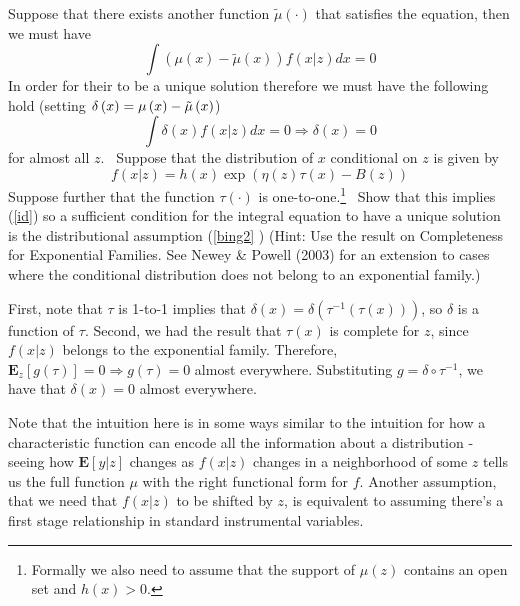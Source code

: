 \documentclass[12pt,english]{article}
\begin{document}
Suppose that there exists another function $%
\tilde{\mu}\left( \cdot \right) $ that satisfies the equation, then we must
have%
\begin{equation*}
\int \left( \mu \left( x\right) -\tilde{\mu}\left( x\right) \right) f\left(
x|z\right) dx=0
\end{equation*}%
In order for their to be a unique solution therefore we must have the
following hold (setting $\delta \left( x\right) =\mu \left( x\right) -\tilde{%
	\mu}\left( x\right) $)%
\begin{equation}
\int \delta \left( x\right) f\left( x|z\right) dx=0\Rightarrow \delta \left(
x\right) =0  \label{id}
\end{equation}%
for almost all $z.$ \ Suppose that the distribution of $x$ conditional on $z$
is given by%
\begin{equation}
f\left( x|z\right) =h\left( x\right) \exp\left(\eta \left(
z\right) \tau \left( x\right)-B(z)\right)  \label{bing2}
\end{equation}%
Suppose further that the function $\tau \left( \cdot \right) $ is
one-to-one.\footnote{Formally we also need to assume that the support
	of $\mu \left( z\right) $ contains an open set and $%
	h\left( x\right) >0$.} \ Show that this implies (\ref{id}) so a
sufficient condition for the integral equation to have a unique
solution is the distributional assumption (\ref{bing2}%
) (Hint: Use the result on Completeness for Exponential Families. See
Newey \& Powell (2003) for an extension to cases where the
conditional distribution does not belong to an exponential family.)
\vspace{1em}

First, note that $\tau$ is 1-to-1 implies that $\delta(x) = \delta(\tau^{-1}(\tau(x)))$, so $\delta$ is a function of $\tau$. Second, we had the result that $\tau(x)$ is complete for $z$, since $f(x | z)$ belongs to the exponential family. Therefore, $\mathbf{E}_{z}[g(\tau)] = 0 \Rightarrow g(\tau) = 0$ almost everywhere. Substituting $g = \delta \circ \tau^{-1}$, we have that $\delta(x) = 0$ almost everywhere.

Note that the intuition here is in some ways similar to the intuition for how a characteristic function can encode all the information about a distribution - seeing how $\mathbf{E}[y | z]$ changes as $f(x | z)$ changes in a neighborhood of some $z$ tells us the full function $\mu$ with the right functional form for $f$. Another assumption, that we need that $f(x | z)$ to be shifted by $z$, is equivalent to assuming there's a first stage relationship in standard instrumental variables.
\end{document}
